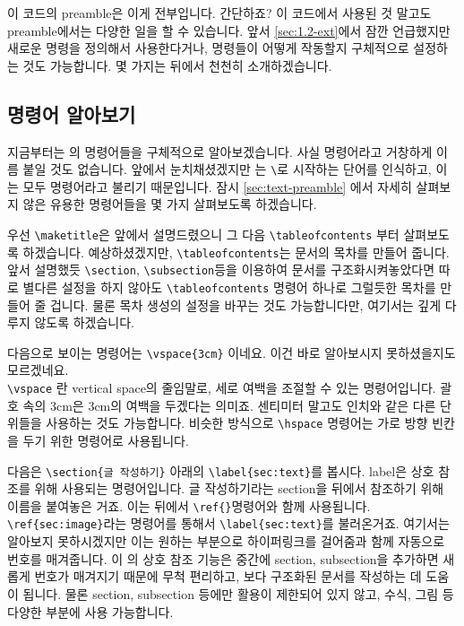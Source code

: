 이 코드의 preamble은 이게 전부입니다. 간단하죠?
이 코드에서 사용된 것 말고도  preamble에서는 다양한 일을 할 수 있습니다.
앞서 \ref{sec:1.2-ext}에서 잠깐 언급했지만 새로운 명령을 정의해서 사용한다거나, 명령들이 어떻게 작동할지 구체적으로 설정하는 것도 가능합니다.
몇 가지는 뒤에서 천천히 소개하겠습니다.


\subsection{명령어 알아보기}
\label{sec:3-cmd}
지금부터는 \lt 의 명령어들을 구체적으로 알아보겠습니다.
사실 명령어라고 거창하게 이름 붙일 것도 없습니다.
앞에서 눈치채셨겠지만 \lt 는 \verb|\|로 시작하는 단어를 인식하고, 이는 모두 명령어라고 불리기 때문입니다.
잠시 \ref{sec:text-preamble} 에서 자세히 살펴보지 않은 유용한 \lt 명령어들을 몇 가지 살펴보도록 하겠습니다.

우선 \verb|\maketitle|은 앞에서 설명드렸으니 그 다음 \verb|\tableofcontents| 부터 살펴보도록 하겠습니다.
예상하셨겠지만, \verb|\tableofcontents|는 문서의 목차를 만들어 줍니다.
앞서 설명했듯 \verb|\section|, \verb|\subsection|등을 이용하여 문서를 구조화시켜놓았다면 따로 별다른 설정을 하지 않아도 \verb|\tableofcontents| 명령어 하나로 그럴듯한 목차를 만들어 줄 겁니다.
물론 목차 생성의 설정을 바꾸는 것도 가능합니다만, 여기서는 깊게 다루지 않도록 하겠습니다.

다음으로 보이는 명령어는 \verb|\vspace{3cm}| 이네요.
이건 바로 알아보시지 못하셨을지도 모르겠네요.\\
\verb|\vspace| 란 vertical space의 줄임말로, 세로 여백을 조절할 수 있는 명령어입니다.
괄호 속의 3cm은 3cm의 여백을 두겠다는 의미죠.
센티미터 말고도 인치와 같은 다른 단위들을 사용하는 것도 가능합니다.
비슷한 방식으로 \verb|\hspace| 명령어는 가로 방향 빈칸을 두기 위한 명령어로 사용됩니다.

다음은 \verb|\section{글 작성하기}| 아래의 \verb|\label{sec:text}|를 봅시다.
label은 상호 참조를 위해 사용되는 명령어입니다.
글 작성하기라는 section을 뒤에서 참조하기 위해 이름을 붙여놓은 거죠.
이는 뒤에서 \verb|\ref{}|명령어와 함께 사용됩니다.
\verb|\ref{sec:image}|라는 명령어를 통해서 \verb|\label{sec:text}|를 불러온거죠.
여기서는 알아보지 못하시겠지만 이는 원하는 부분으로 하이퍼링크를 걸어줌과 함께 자동으로 번호를 매겨줍니다.
이 \lt 의 상호 참조 기능은 중간에 section, subsection을 추가하면 새롭게 번호가 매겨지기 때문에 무척 편리하고, 보다 구조화된 문서를 작성하는 데 도움이 됩니다.
물론 section, subsection 등에만 활용이 제한되어 있지 않고, 수식, 그림 등 다양한 부분에 사용 가능합니다.

